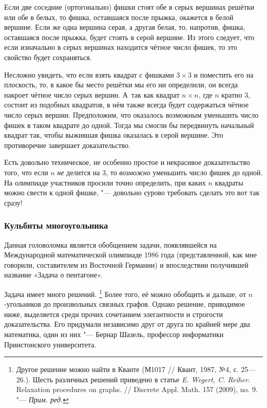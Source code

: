 \documentclass[twoside]{book}
\begin{document}
Если две соседние (ортогонально) фишки стоят обе в серых вершинах решётки или обе в белых, то фишка, оставшаяся после прыжка, окажется в белой вершине.
Если же одна вершина серая, а другая белая, то, напротив, фишка, оставшаяся после прыжка, будет стоять в серой вершине.
Из этого следует, что если изначально в серых вершинах находится чётное число фишек, то это свойство будет сохраняться.

Несложно увидеть, что если взять квадрат с фишками $3\times 3$ и поместить его на плоскость, то, в какое бы место решётки мы его ни определили, он всегда накроет чётное число серых вершин.
А~так как квадрат $n\times n$, где $n$ кратно $3$, состоит из подобных квадратов,  в нём также всегда будет содержаться чётное число серых вершин.
Предположим, что оказалось возможным уменьшить число фишек в таком квадрате до одной.
Тогда мы смогли бы передвинуть начальный квадрат так, чтобы выжившая фишка оказалась в серой вершине. 
Это противоречие завершает доказательство.
\heart

Есть довольно техническое, не особенно простое и некрасивое 
доказательство того, что если $n$ \emph{не} делится на $3$, то \emph{возможно} уменьшить число фишек до одной.
На олимпиаде участников просили точно определить, при каких $n$ квадраты можно свести к одной фишке, "--- довольно сурово требовать сделать это вот так сразу!

\subsubsection*{Кульбиты многоугольника}%

Данная головоломка является обобщением задачи, появлявшейся на Международной математической олимпиаде 1986 года (представленной, как мне говорили, составителем из Восточной Германии) и впоследствии получившей название «Задача о пентагоне».

Задача имеет много решений.
\footnote{Другое решение можно найти в Кванте (М1017 /\!/ Квант, 1987, №4, с. 25---26.).
Шесть различных решений приведено в статье \emph{E. Wegert, C. Reiher}. Relaxation procedures on graphs. /\!/ Discrete Appl. Math. 157 (2009), no. 9. "--- \emph{Прим. ред.}}
Более того, её можно обобщить и дальше, от $n$-угольников до произвольных связных графов.
Однако решение, приводимое ниже, выделяется среди прочих сочетанием элегантности и строгости доказательства.
Его придумали независимо друг от друга по крайней мере два математика, один из них "--- Бернар Шазель, профессор информатики Принстонского университета. %
\end{document}

